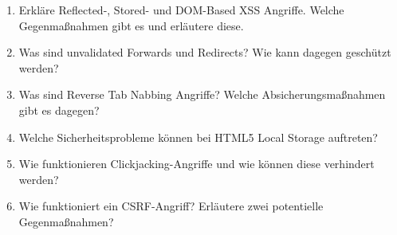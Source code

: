 \begin{enumerate}
\item Erkläre Reflected-, Stored- und DOM-Based XSS Angriffe. Welche Gegenmaßnahmen gibt es und erläutere diese.
\item Was sind unvalidated Forwards und Redirects? Wie kann dagegen geschützt werden?
\item Was sind Reverse Tab Nabbing Angriffe? Welche Absicherungsmaßnahmen gibt es dagegen?
\item Welche Sicherheitsprobleme können bei HTML5 Local Storage auftreten?
\item Wie funktionieren Clickjacking-Angriffe und wie können diese verhindert werden?
\item Wie funktioniert ein CSRF-Angriff? Erläutere zwei potentielle Gegenmaßnahmen?
\end{enumerate}
